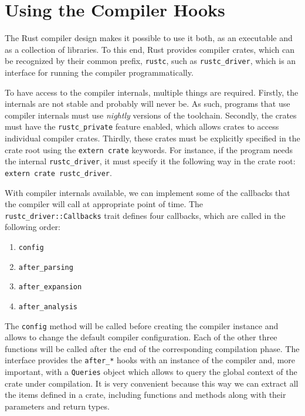 \documentclass[paper=a4,%
  twoside,%
  BCOR4mm,%
  abstract=true,%
  toc=bibliography,%
  chapterprefix=true,%
  toc=bibliographynumbered,%
  open=right,%
  english,%
  pagesize=pdftex]{scrreprt}
\begin{document}
\section{Using the Compiler Hooks}
The Rust compiler design makes it possible to use it both, as an executable and as a collection of libraries. To this end, Rust provides compiler crates, which can be recognized by their common prefix, \texttt{rustc}, such as \texttt{rustc\string_driver}, which is an interface for running the compiler programmatically.

To have access to the compiler internals, multiple things are required. Firstly, the internals are not stable and probably will never be. As such, programs that use compiler internals must use \emph{nightly} versions of the toolchain. Secondly, the crates must have the \texttt{rustc\string_private} feature enabled, which allows crates to access individual compiler crates. Thirdly, these crates must be explicitly specified in the crate root using the \texttt{extern crate} keywords. For instance, if the program needs the internal \texttt{rustc\string_driver}, it must specify it the following way in the crate root: \texttt{extern crate rustc\string_driver}.

With compiler internals available, we can implement some of the callbacks that the compiler will call at appropriate point of time. The \texttt{rustc\string_driver::Callbacks} trait defines four callbacks, which are called in the following order:
\begin{enumerate}
    \item \texttt{config}
    \item \texttt{after\string_parsing}
    \item \texttt{after\string_expansion}
    \item \texttt{after\string_analysis}
\end{enumerate}

The \texttt{config} method will be called before creating the compiler instance and allows to change the default compiler configuration. Each of the other three functions will be called after the end of the corresponding compilation phase. The interface provides the \texttt{after\string_*} hooks with an instance of the compiler and, more important, with a \texttt{Queries} object which allows to query the global context of the crate under compilation. It is very convenient because this way we can extract all the items defined in a crate, including functions and methods along with their parameters and return types. %
\end{document}
